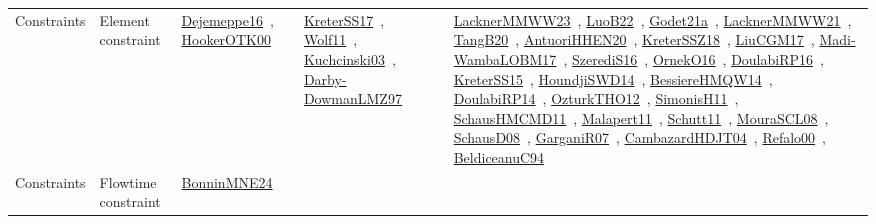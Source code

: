 {\begin{longtable}{lp{3cm}>{\raggedright\arraybackslash}p{6cm}>{\raggedright\arraybackslash}p{6cm}>{\raggedright\arraybackslash}p{8cm}}
Constraints & Element constraint & \href{../works/Dejemeppe16.pdf}{Dejemeppe16}~\cite{Dejemeppe16}, \href{../works/HookerOTK00.pdf}{HookerOTK00}~\cite{HookerOTK00} & \href{../works/KreterSS17.pdf}{KreterSS17}~\cite{KreterSS17}, \href{../works/Wolf11.pdf}{Wolf11}~\cite{Wolf11}, \href{../works/Kuchcinski03.pdf}{Kuchcinski03}~\cite{Kuchcinski03}, \href{../works/Darby-DowmanLMZ97.pdf}{Darby-DowmanLMZ97}~\cite{Darby-DowmanLMZ97} & \href{../works/LacknerMMWW23.pdf}{LacknerMMWW23}~\cite{LacknerMMWW23}, \href{../works/LuoB22.pdf}{LuoB22}~\cite{LuoB22}, \href{../works/Godet21a.pdf}{Godet21a}~\cite{Godet21a}, \href{../works/LacknerMMWW21.pdf}{LacknerMMWW21}~\cite{LacknerMMWW21}, \href{../works/TangB20.pdf}{TangB20}~\cite{TangB20}, \href{../works/AntuoriHHEN20.pdf}{AntuoriHHEN20}~\cite{AntuoriHHEN20}, \href{../works/KreterSSZ18.pdf}{KreterSSZ18}~\cite{KreterSSZ18}, \href{../works/LiuCGM17.pdf}{LiuCGM17}~\cite{LiuCGM17}, \href{../works/Madi-WambaLOBM17.pdf}{Madi-WambaLOBM17}~\cite{Madi-WambaLOBM17}, \href{../works/SzerediS16.pdf}{SzerediS16}~\cite{SzerediS16}, \href{../works/OrnekO16.pdf}{OrnekO16}~\cite{OrnekO16}, \href{../works/DoulabiRP16.pdf}{DoulabiRP16}~\cite{DoulabiRP16}, \href{../works/KreterSS15.pdf}{KreterSS15}~\cite{KreterSS15}, \href{../works/HoundjiSWD14.pdf}{HoundjiSWD14}~\cite{HoundjiSWD14}, \href{../works/BessiereHMQW14.pdf}{BessiereHMQW14}~\cite{BessiereHMQW14}, \href{../works/DoulabiRP14.pdf}{DoulabiRP14}~\cite{DoulabiRP14}, \href{../works/OzturkTHO12.pdf}{OzturkTHO12}~\cite{OzturkTHO12}, \href{../works/SimonisH11.pdf}{SimonisH11}~\cite{SimonisH11}, \href{../works/SchausHMCMD11.pdf}{SchausHMCMD11}~\cite{SchausHMCMD11}, \href{../works/Malapert11.pdf}{Malapert11}~\cite{Malapert11}, \href{../works/Schutt11.pdf}{Schutt11}~\cite{Schutt11}, \href{../works/MouraSCL08.pdf}{MouraSCL08}~\cite{MouraSCL08}, \href{../works/SchausD08.pdf}{SchausD08}~\cite{SchausD08}, \href{../works/GarganiR07.pdf}{GarganiR07}~\cite{GarganiR07}, \href{../works/CambazardHDJT04.pdf}{CambazardHDJT04}~\cite{CambazardHDJT04}, \href{../works/Refalo00.pdf}{Refalo00}~\cite{Refalo00}, \href{../works/BeldiceanuC94.pdf}{BeldiceanuC94}~\cite{BeldiceanuC94}\\
Constraints & Flowtime constraint & \href{../works/BonninMNE24.pdf}{BonninMNE24}~\cite{BonninMNE24} &  & \\

\end{longtable}}
